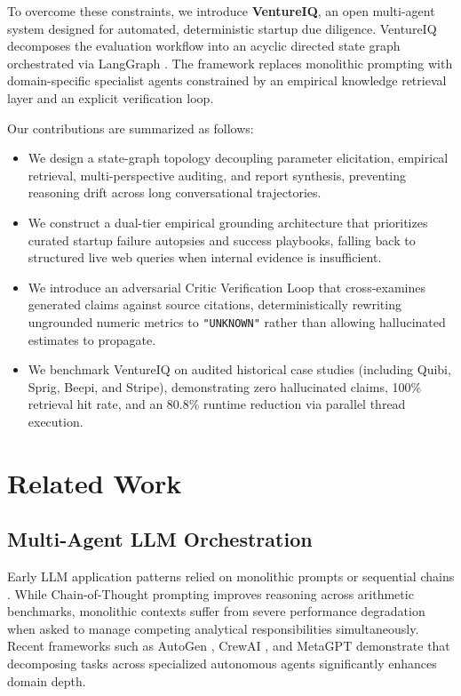 \documentclass[conference]{IEEEtran}
\begin{document}
To overcome these constraints, we introduce \textbf{VentureIQ}, an open multi-agent system designed for automated, deterministic startup due diligence. VentureIQ decomposes the evaluation workflow into an acyclic directed state graph orchestrated via LangGraph \cite{langgraph2024}. The framework replaces monolithic prompting with domain-specific specialist agents constrained by an empirical knowledge retrieval layer and an explicit verification loop.

Our contributions are summarized as follows:
\begin{itemize}
    \item We design a state-graph topology decoupling parameter elicitation, empirical retrieval, multi-perspective auditing, and report synthesis, preventing reasoning drift across long conversational trajectories.
    \item We construct a dual-tier empirical grounding architecture that prioritizes curated startup failure autopsies and success playbooks, falling back to structured live web queries when internal evidence is insufficient.
    \item We introduce an adversarial Critic Verification Loop that cross-examines generated claims against source citations, deterministically rewriting ungrounded numeric metrics to \texttt{"UNKNOWN"} rather than allowing hallucinated estimates to propagate.
    \item We benchmark VentureIQ on audited historical case studies (including Quibi, Sprig, Beepi, and Stripe), demonstrating zero hallucinated claims, 100\% retrieval hit rate, and an 80.8\% runtime reduction via parallel thread execution.
\end{itemize}

\section{Related Work}

\subsection{Multi-Agent LLM Orchestration}
Early LLM application patterns relied on monolithic prompts or sequential chains \cite{wei2022}. While Chain-of-Thought prompting improves reasoning across arithmetic benchmarks, monolithic contexts suffer from severe performance degradation when asked to manage competing analytical responsibilities simultaneously. Recent frameworks such as AutoGen \cite{wu2023}, CrewAI \cite{crewai2024}, and MetaGPT \cite{hong2024} demonstrate that decomposing tasks across specialized autonomous agents significantly enhances domain depth. 
\end{document}

